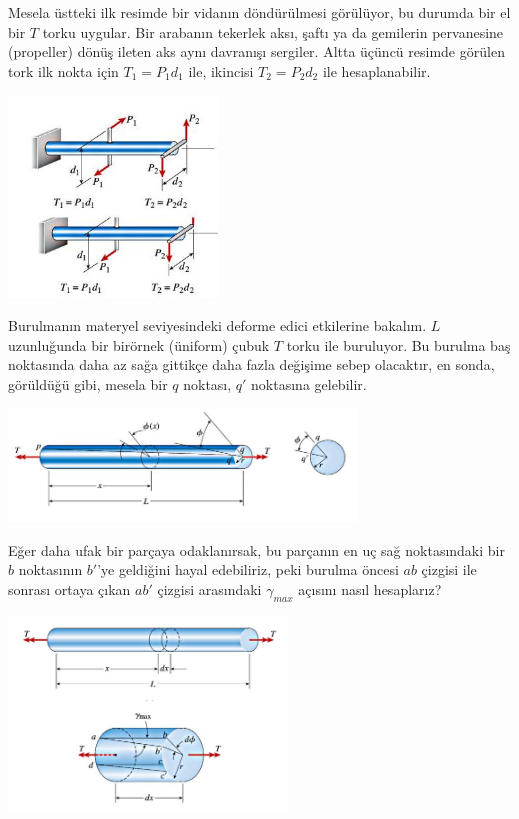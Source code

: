 \documentclass[12pt,fleqn]{article}\usepackage{../../common}
\begin{document}
Mesela üstteki ilk resimde bir vidanın döndürülmesi görülüyor, bu durumda bir el
bir $T$ torku uygular. Bir arabanın tekerlek aksı, şaftı ya da gemilerin
pervanesine (propeller) dönüş ileten aks aynı davranışı sergiler.  Altta üçüncü
resimde görülen tork ilk nokta için $T_1 = P_1 d_1$ ile, ikincisi $T_2 = P_2
d_2$ ile hesaplanabilir.

\includegraphics[width=15em]{phy_020_strs_06_02.jpg}

Burulmanın materyel seviyesindeki deforme edici etkilerine bakalım. $L$
uzunluğunda bir birörnek (üniform) çubuk $T$ torku ile buruluyor. Bu
burulma baş noktasında daha az sağa gittikçe daha fazla değişime
sebep olacaktır, en sonda, görüldüğü gibi, mesela bir $q$ noktası, $q'$
noktasına gelebilir. 

\includegraphics[width=25em]{phy_020_strs_06_03.jpg}

Eğer daha ufak bir parçaya odaklanırsak, bu parçanın en uç sağ noktasındaki
bir $b$ noktasının $b'$'ye geldiğini hayal edebiliriz, peki burulma öncesi $ab$
çizgisi ile sonrası ortaya çıkan $ab'$ çizgisi arasındaki  $\gamma_{max}$
açısını nasıl hesaplarız? 

\includegraphics[width=20em]{phy_020_strs_06_04.jpg}
\end{document}
